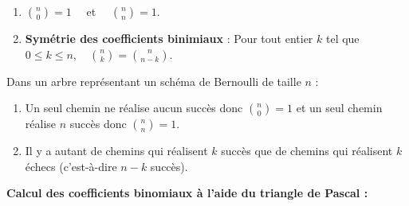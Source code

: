 \documentclass[a4paper,11pt,cours]{nsi} %
\begin{document}
\begin{propriete}[s]
    \begin{enumerate}[label=\textbullet]
        \item $\displaystyle\binom{n}{0}=1\quad$ et $\quad\displaystyle\binom{n}{n}=1$.
        \item \textbf{Symétrie des coefficients binimiaux} : Pour tout entier $k$ tel que $0\leqslant k\leqslant n, \quad \displaystyle \binom{n}{k}=\binom{n}{n-k}$.
    \end{enumerate}
\end{propriete}

\begin{demonstration}
    Dans un arbre représentant un schéma de Bernoulli de taille $n$ :
    \begin{enumerate}[label=\textbullet]
        \item  Un seul chemin ne réalise aucun succès donc $\displaystyle\binom{n}{0}=1$ et un seul chemin réalise $n$ succès donc $\displaystyle\binom{n}{n}=1$.
        \item Il y a autant de chemins qui réalisent $k$ succès que de chemins qui réalisent $k$ échecs (c'est-à-dire $n-k$ succès).
    \end{enumerate}
\end{demonstration}


\textbf{Calcul des coefficients binomiaux à l'aide du triangle de Pascal :}\\
\end{document}
